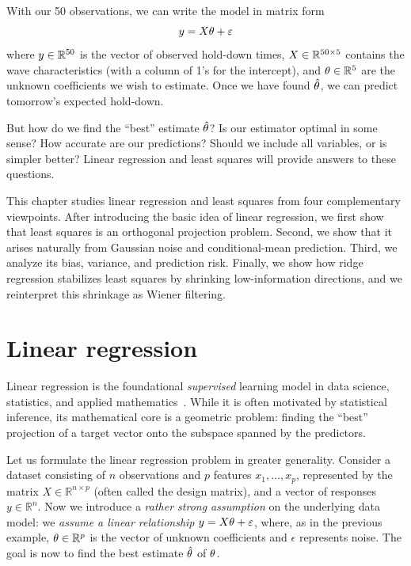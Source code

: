 With our 50 observations, we can write the model in matrix form
$$y = X \theta + \varepsilon$$
where $y \in \mathbb{R}^{50}$ is the vector of observed hold-down times, 
$X \in \mathbb{R}^{50 \times 5}$ contains the wave characteristics (with a column of 1's 
for the intercept), and $\theta \in \mathbb{R}^5$ are the unknown coefficients we wish to estimate. Once we have found $\hat{\theta}$, we can predict tomorrow's expected hold-down.

But how do we find the ``best'' estimate $\hat{\theta}$? Is our estimator optimal in some sense? How accurate are our predictions?  Should we include all variables, or is simpler better? Linear regression and least squares will provide answers to these questions.

\medskip
This chapter studies linear regression and least squares from four complementary viewpoints. 
After introducing the basic idea of linear regression, we first show that least squares is an orthogonal projection problem. Second, we show that it arises naturally from Gaussian noise and conditional-mean prediction. Third, we analyze its bias, variance, and prediction risk. Finally, we show how ridge regression stabilizes least squares by shrinking low-information directions, and we reinterpret this shrinkage as Wiener filtering.


\section{Linear regression}




Linear regression is the foundational {\em supervised} learning model in data science, statistics, and applied mathematics~\cite{hastieelements,LVanderberghe_SBoyd_book,Golub_MatrixComputations}.
While it is often motivated by statistical inference, its mathematical core is a geometric problem: finding the ``best'' projection of a target vector onto the subspace spanned by the predictors.




Let us formulate the linear regression problem in greater generality.
Consider a dataset consisting of $n$ observations and $p$ features $x_1,\dots,x_p$, represented by the matrix $X \in \mathbb{R}^{n \times p}$ (often called the design matrix), and a vector of responses $y \in \mathbb{R}^n$. Now we introduce a {\em rather strong assumption} on the underlying data model: we {\em assume a linear relationship}
$y = X\theta + \varepsilon$,
where, as in the previous example, $\theta \in \mathbb{R}^p$ is the vector of unknown coefficients and $\epsilon$ represents noise. The goal is now to find the best estimate $\hat{\theta}$ of $\theta$.




